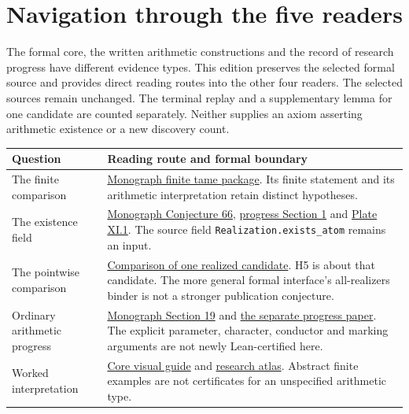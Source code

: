 \clearpage
\section*{Navigation through the five readers}
{}
The formal core, the written arithmetic constructions and the record of research progress have different evidence types. This edition preserves the selected formal source and provides direct reading routes into the other four readers. The selected sources remain unchanged. The terminal replay and a supplementary lemma for one candidate are counted separately. Neither supplies an axiom asserting arithmetic existence or a new discovery count.

\begin{tabular}{@{}>{\raggedright\arraybackslash}p{.29\linewidth}>{\raggedright\arraybackslash}p{.66\linewidth}@{}}\toprule
Question & Reading route and formal boundary\\\midrule
The finite comparison & \href{https://komorebi.invalid/b07/lean_finite}{Monograph finite tame package}. Its finite statement and its arithmetic interpretation retain distinct hypotheses.\\[9pt]
The existence field & \href{https://komorebi.invalid/b07/lean_contract}{Monograph Conjecture 66}, \href{https://komorebi.invalid/b07/lean_research_contract}{progress Section 1} and \href{https://komorebi.invalid/b07/lean_v01}{Plate XI.1}. The source field \texttt{Realization.exists\_atom} remains an input.\\[9pt]
The pointwise comparison & \href{https://komorebi.invalid/b07/lean_comparison}{Comparison of one realized candidate}. H5 is about that candidate. The more general formal interface's all-realizers binder is not a stronger publication conjecture.\\[9pt]
Ordinary arithmetic progress & \href{https://komorebi.invalid/b07/lean_arithmetic}{Monograph Section 19} and \href{https://komorebi.invalid/b07/lean_progress}{the separate progress paper}. The explicit parameter, character, conductor and marking arguments are not newly Lean-certified here.\\[9pt]
Worked interpretation & \href{https://komorebi.invalid/b07/lean_core_visual}{Core visual guide} and \href{https://komorebi.invalid/b07/lean_atlas}{research atlas}. Abstract finite examples are not certificates for an unspecified arithmetic type.\\\bottomrule
\end{tabular}

